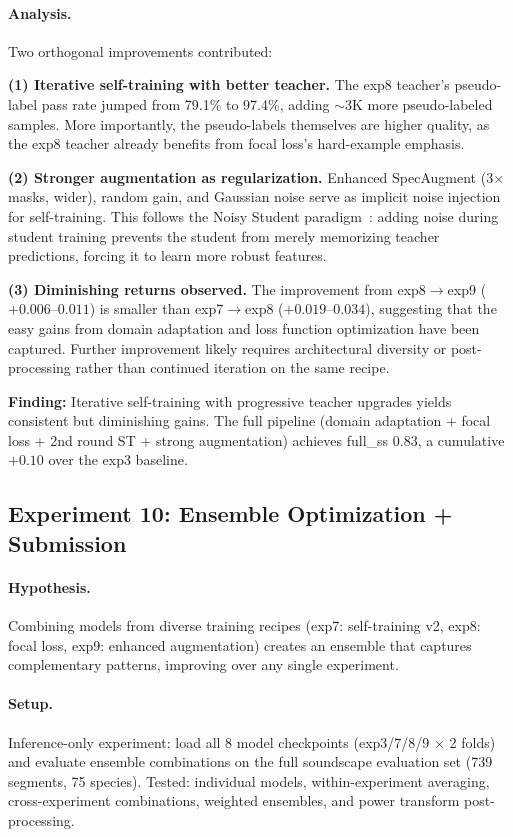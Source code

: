 \paragraph{Analysis.}
Two orthogonal improvements contributed:

\textbf{(1) Iterative self-training with better teacher.}
The exp8 teacher's pseudo-label pass rate jumped from 79.1\% to 97.4\%,
adding $\sim$3K more pseudo-labeled samples. More importantly, the
pseudo-labels themselves are higher quality, as the exp8 teacher already
benefits from focal loss's hard-example emphasis.

\textbf{(2) Stronger augmentation as regularization.}
Enhanced SpecAugment (3$\times$ masks, wider), random gain, and Gaussian noise
serve as implicit noise injection for self-training. This follows the
Noisy Student paradigm~\cite{xie2020self}: adding noise during student
training prevents the student from merely memorizing teacher predictions,
forcing it to learn more robust features.

\textbf{(3) Diminishing returns observed.}
The improvement from exp8$\to$exp9 ($+0.006$--$0.011$) is smaller than
exp7$\to$exp8 ($+0.019$--$0.034$), suggesting that the easy gains from
domain adaptation and loss function optimization have been captured.
Further improvement likely requires architectural diversity or
post-processing rather than continued iteration on the same recipe.

\textbf{Finding:} Iterative self-training with progressive teacher upgrades
yields consistent but diminishing gains. The full pipeline (domain adaptation +
focal loss + 2nd round ST + strong augmentation) achieves full\_ss
0.83, a cumulative $+0.10$ over the exp3 baseline.

\subsection{Experiment 10: Ensemble Optimization + Submission}
\label{sec:exp10}

\paragraph{Hypothesis.}
Combining models from diverse training recipes (exp7: self-training v2,
exp8: focal loss, exp9: enhanced augmentation) creates an ensemble that
captures complementary patterns, improving over any single experiment.

\paragraph{Setup.}
Inference-only experiment: load all 8 model checkpoints (exp3/7/8/9 $\times$ 2
folds) and evaluate ensemble combinations on the full soundscape evaluation set
(739 segments, 75 species). Tested: individual models, within-experiment
averaging, cross-experiment combinations, weighted ensembles, and power transform
post-processing.

